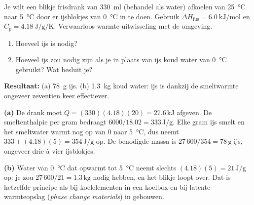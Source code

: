 \begin{oefening}
Je wilt een blikje frisdrank van \SI{330}{\milli\litre} (behandel als water) afkoelen van \SI{25}{\celsius} naar \SI{5}{\celsius} door er ijsblokjes van \SI{0}{\celsius} in te doen. Gebruik $\Delta H_{\text{fus}} = \SI{6.0}{\kilo\joule\per\mole}$ en $C_p = \SI{4.18}{\joule\per\gram\per\kelvin}$. Verwaarloos warmte-uitwisseling met de omgeving.
\begin{enumerate}
\item[(a)] Hoeveel ijs is nodig?
\item[(b)] Hoeveel ijs zou nodig zijn als je in plaats van ijs koud water van \SI{0}{\celsius} gebruikt? Wat besluit je?
\end{enumerate}
\end{oefening}
\begin{oplossing}
\textbf{Resultaat:} (a) \SI{78}{\gram} ijs. (b) \SI{1.3}{\kilogram} koud water: ijs is dankzij de smeltwarmte ongeveer zeventien keer effectiever.

\textbf{(a)} De drank moet $Q = (330)(4.18)(20) = 27.6\,\mathrm{kJ}$ afgeven. De smeltenthalpie per gram bedraagt $6000/18.02 = 333\,\mathrm{J/g}$. Elke gram ijs smelt en het smeltwater warmt nog op van 0 naar \SI{5}{\celsius}, dus neemt $333 + (4.18)(5) = 354\,\mathrm{J/g}$ op. De benodigde massa is $27\,600/354 = 78\,\mathrm{g}$ ijs, ongeveer drie \`a vier ijsblokjes.

\textbf{(b)} Water van \SI{0}{\celsius} dat opwarmt tot \SI{5}{\celsius} neemt slechts $(4.18)(5) = 21\,\mathrm{J/g}$ op: je zou $27\,600/21 = 1.3\,\mathrm{kg}$ nodig hebben, en het blikje loopt over. Dat is hetzelfde principe als bij koelelementen in een koelbox en bij latente-warmteopslag (\emph{phase change materials}) in gebouwen.
\end{oplossing}

